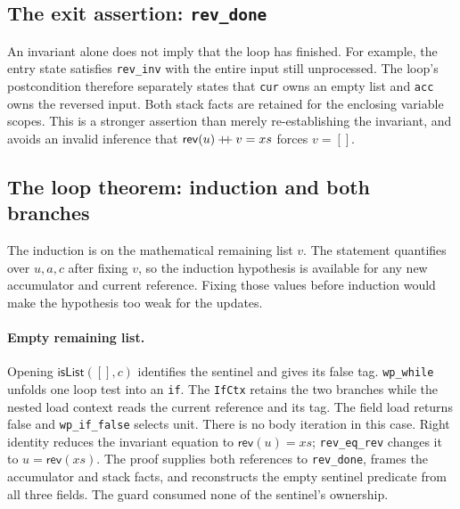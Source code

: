 \documentclass[11pt]{article}
\begin{document}
\subsection{The exit assertion: \texttt{rev\_done}}

\begin{minipage}{\linewidth}

\end{minipage}

An invariant alone does not imply that the loop has finished. For example, the
entry state satisfies \texttt{rev\_inv} with the entire input still unprocessed.
The loop's postcondition therefore separately states that \texttt{cur} owns an
empty list and \texttt{acc} owns the reversed input. Both stack facts are
retained for the enclosing variable scopes. This is a stronger assertion than
merely re-establishing the invariant, and avoids an invalid inference that
\(\mathsf{rev}(u)\mathbin{+\mkern-6mu+}v=xs\) forces \(v=[]\).

\subsection{The loop theorem: induction and both branches}



The induction is on the mathematical remaining list \(v\). The statement
quantifies over \(u,a,c\) after fixing \(v\), so the induction hypothesis is
available for any new accumulator and current reference. Fixing those values
before induction would make the hypothesis too weak for the updates.

\paragraph{Empty remaining list.}
Opening \(\mathsf{isList}([],c)\) identifies the sentinel and gives its false
tag. \texttt{wp\_while} unfolds one loop test into an \texttt{if}.
The \texttt{IfCtx} retains the two branches while the nested load context
reads the current reference and its tag. The field load returns false and
\texttt{wp\_if\_false} selects unit. There is no body iteration in this case.
Right identity reduces the invariant equation to \(\mathsf{rev}(u)=xs\);
\texttt{rev\_eq\_rev} changes it to \(u=\mathsf{rev}(xs)\).
The proof supplies both references to \texttt{rev\_done}, frames the accumulator
and stack facts, and reconstructs the empty sentinel predicate from all three
fields. The guard consumed none of the sentinel's ownership.
\end{document}
